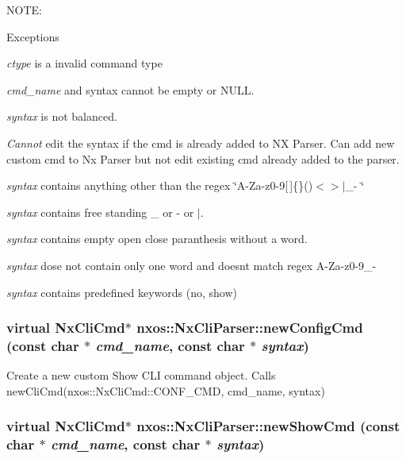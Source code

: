 NOTE: 
\begin{DoxyExceptions}{Exceptions}
\item[{\em ctype}]is a invalid command type \item[{\em cmd\_\-name}]and syntax cannot be empty or NULL. \item[{\em syntax}]is not balanced. \item[{\em Cannot}]edit the syntax if the cmd is already added to NX Parser. Can add new custom cmd to Nx Parser but not edit existing cmd already added to the parser. \item[{\em syntax}]contains anything other than the regex \char`\"{}A-\/Za-\/z0-\/9\mbox{[}$\,$\mbox{]}\{\}()$<$$>$$|$\_\--\/ \char`\"{} \item[{\em syntax}]contains free standing \_\- or -\/ or $|$. \item[{\em syntax}]contains empty open close paranthesis without a word. \item[{\em syntax}]dose not contain only one word and doesnt match regex A-\/Za-\/z0-\/9\_\--\/ \item[{\em syntax}]contains predefined keywords (no, show) \end{DoxyExceptions}
\hypertarget{classnxos_1_1NxCliParser_a51481c851ccf87288513ba73e0380895}{
\subsubsection[{newConfigCmd}]{\setlength{\rightskip}{0pt plus 5cm}virtual {\bf NxCliCmd}$\ast$ nxos::NxCliParser::newConfigCmd (const char $\ast$ {\em cmd\_\-name}, \/  const char $\ast$ {\em syntax})}}
\label{classnxos_1_1NxCliParser_a51481c851ccf87288513ba73e0380895}
Create a new custom Show CLI command object. Calls newCliCmd(nxos::NxCliCmd::CONF\_\-CMD, cmd\_\-name, syntax) \hypertarget{classnxos_1_1NxCliParser_ac07fa22d7d83d4c9015ea1f3976163d8}{
\subsubsection[{newShowCmd}]{\setlength{\rightskip}{0pt plus 5cm}virtual {\bf NxCliCmd}$\ast$ nxos::NxCliParser::newShowCmd (const char $\ast$ {\em cmd\_\-name}, \/  const char $\ast$ {\em syntax})}}
